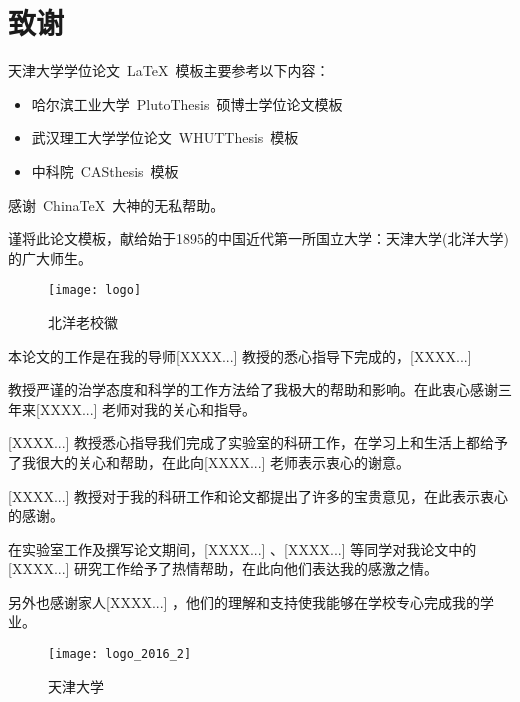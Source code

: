 
\chapter*{致\quad 谢}

天津大学学位论文~\LaTeX~模板主要参考以下内容：
\begin{itemize}
  \item 哈尔滨工业大学~PlutoThesis~硕博士学位论文模板
  \item 武汉理工大学学位论文~WHUTThesis~模板
  \item 中科院~CASthesis~模板
\end{itemize}

感谢~ChinaTeX~大神的无私帮助。

谨将此论文模板，献给始于1895的中国近代第一所国立大学：天津大学(北洋大学)的广大师生。
\begin{figure}[htbp1]
\centering
\texttt{[image: logo]}
\caption{北洋老校徽}\label{fig:xml}
\end{figure}

\vspace*{1cm}
本论文的工作是在我的导师[XXXX...] 教授的悉心指导下完成的，[XXXX...]

教授严谨的治学态度和科学的工作方法给了我极大的帮助和影响。在此衷心感谢三年来[XXXX...] 老师对我的关心和指导。

[XXXX...] 教授悉心指导我们完成了实验室的科研工作，在学习上和生活上都给予了我很大的关心和帮助，在此向[XXXX...] 老师表示衷心的谢意。

[XXXX...] 教授对于我的科研工作和论文都提出了许多的宝贵意见，在此表示衷心的感谢。

在实验室工作及撰写论文期间，[XXXX...] 、[XXXX...] 等同学对我论文中的[XXXX...] 研究工作给予了热情帮助，在此向他们表达我的感激之情。

另外也感谢家人[XXXX...] ，他们的理解和支持使我能够在学校专心完成我的学业。

\begin{figure}[htbp1]
\centering
\texttt{[image: logo\_2016\_2]}
\caption{天津大学}\label{fig:xml}
\end{figure}

